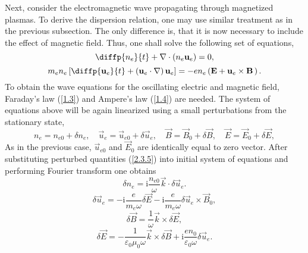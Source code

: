 Next, consider the electromagnetic wave propagating through magnetized plasmas. To derive the dispersion relation, one may use similar treatment as in the previous subsection. The only difference is, that it is now necessary to include the effect of magnetic field. Thus, one shall solve the following set of equations,
\begin{equation}
\label{2.3.1}
\diffp{n_e}{t} + \nabla \cdot \left(n_e \vec{u}_e \right) = 0,
\end{equation}
\begin{equation}
\label{2.3.2}
m_e n_e \left[ \diffp{\vec{u}_e}{t} + \left(\vec{u}_e \cdot \nabla \right) \vec{u}_e \right] = - e n_e \left(\vec{E} + \vec{u}_e \times \vec{B} \, \right).
\end{equation}
To obtain the wave equations for the oscillating electric and magnetic field, Faraday's law (\ref{1.3}) and Ampere's law (\ref{1.4}) are needed. The system of equations above will be again linearized using a small perturbations from the stationary state,
\begin{equation}
\label{2.3.4}
n_{e} = n_{e0} + \delta n_{e}, \quad \vec{u}_{e} = \vec{u}_{e0} + \delta \vec{u}_{e}, \quad \vec{B} = \vec{B}_{0} + \delta \vec{B}, \quad \vec{E} = \vec{E}_{0} + \delta \vec{E},
\end{equation}
As in the previous case, $ \vec{u}_{e0} $ and $ \vec{E}_{0} $ are identically equal to zero vector. After substituting perturbed quantities (\ref{2.3.5}) into initial system of equations and performing Fourier transform one obtains
\begin{equation}
\label{2.3.5}
\delta n_{e} = \mathrm{i} \frac{n_{e0}}{\omega} \vec{k} \cdot \delta \vec{u}_{e}.
\end{equation}
\begin{equation}
\label{2.3.6}
\delta \vec{u}_{e} = - \mathrm{i} \frac{e}{m_{e} \omega} \delta \vec{E} - \mathrm{i} \frac{e}{m_{e} \omega} \delta \vec{u}_{e} \times \vec{B}_{0},
\end{equation}
\begin{equation}
\label{2.3.7}
\delta \vec{B} = \frac{1}{\omega} \vec{k} \times \delta \vec{E},
\end{equation}
\begin{equation}
\label{2.3.8}
\delta \vec{E} = - \frac{1}{\varepsilon_{0} \mu_{0} \omega} \vec{k} \times \delta \vec{B} + \mathrm{i} \frac{e n_{0}}{\varepsilon_{0} \omega} \delta \vec{u}_{e}.
\end{equation}

